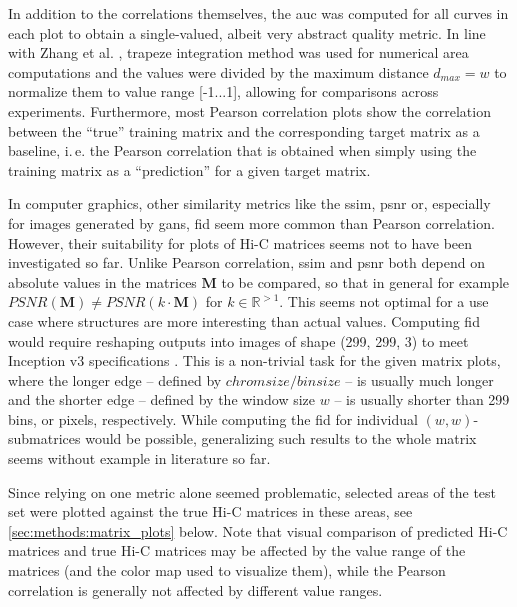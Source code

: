 In addition to the correlations themselves, the \acrfull{auc} was computed for all curves in each plot 
to obtain a single-valued, albeit very abstract quality metric.
In line with Zhang et al. \cite{Zhang2019}, trapeze integration method was used for numerical area computations
and the values were divided by the maximum distance $d_\mathit{max} = w$ to normalize them to value range [-1...1],
allowing for comparisons across experiments.
Furthermore, most Pearson correlation plots show the correlation between the ``true'' training matrix and the corresponding target matrix as a baseline,
i.\,e. the Pearson correlation that is obtained when simply using the training matrix as a ``prediction'' for a given target matrix.

In computer graphics, other similarity metrics like the \acrfull{ssim}, \acrfull{psnr} or, especially for images generated by \acrshort{gan}s, 
\acrfull{fid} seem more common than Pearson correlation.
However, their suitability for plots of Hi-C matrices seems not to have been investigated so far. 
Unlike Pearson correlation, \acrshort{ssim} and \acrshort{psnr} both depend on absolute values in the matrices $\mathbf{M}$ to be compared, 
so that in general for example $\mathit{PSNR}(\mathbf{M}) \not=\mathit{PSNR}(k\cdot \mathbf{M})$ for $k\in\mathbb{R}^{>1}$.
This seems not optimal for a use case where structures are more interesting than actual values.
Computing \acrshort{fid} would require reshaping outputs into images of shape (299, 299, 3) to meet Inception v3 specifications \cite{Szegedy2016}.
This is a non-trivial task for the given matrix plots,
where the longer edge -- defined by $\mathit{chromsize}/\mathit{binsize}$ -- is usually much longer 
and the shorter edge -- defined by the window size $w$ -- is usually shorter than 299 bins, or pixels, respectively.
While computing the \acrshort{fid} for individual $(w,w)$-submatrices would be possible,
generalizing such results to the whole matrix seems without example in literature so far.

Since relying on one metric alone seemed problematic, selected areas of the test set were plotted against the true 
Hi-C matrices in these areas, see \cref{sec:methods:matrix_plots} below.
Note that visual comparison of predicted Hi-C matrices and true Hi-C matrices may be affected by
the value range of the matrices (and the color map used to visualize them), while the Pearson correlation is generally not affected by different
value ranges.

